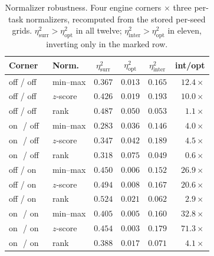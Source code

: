 \documentclass[letterpaper]{article}
\theoremstyle{plain}
\begin{document}
\begin{table}[t]
\centering
\caption{Normalizer robustness. Four engine corners $\times$ three per-task normalizers, recomputed from the stored per-seed grids. $\eta^2_{\text{surr}}>\eta^2_{\text{opt}}$ in all twelve; $\eta^2_{\text{inter}}>\eta^2_{\text{opt}}$ in eleven, inverting only in the marked row.}
\label{tab:normrob}
\small
\setlength{\tabcolsep}{3.5pt}
\begin{tabular}{llcccr}
\toprule
Corner & Norm. & $\eta^2_{\text{surr}}$ & $\eta^2_{\text{opt}}$ & $\eta^2_{\text{inter}}$ & int/opt \\
\midrule
off / off & min--max & $0.367$ & $0.013$ & $0.165$ & $12.4\times$ \\
off / off & $z$-score & $0.426$ & $0.019$ & $0.193$ & $10.0\times$ \\
off / off & rank      & $0.487$ & $0.050$ & $0.053$ & $1.1\times$ \\
on\ \,/ off & min--max & $0.283$ & $0.036$ & $0.146$ & $4.0\times$ \\
on\ \,/ off & $z$-score & $0.347$ & $0.042$ & $0.189$ & $4.5\times$ \\
on\ \,/ off & rank     & $0.318$ & $0.075$ & $0.049$ & $\mathbf{0.6\times}$ \\
off / on\ \, & min--max & $0.450$ & $0.006$ & $0.152$ & $26.9\times$ \\
off / on\ \, & $z$-score & $0.494$ & $0.008$ & $0.167$ & $20.6\times$ \\
off / on\ \, & rank     & $0.524$ & $0.021$ & $0.062$ & $2.9\times$ \\
on\ \,/ on\ \, & min--max & $0.405$ & $0.005$ & $0.160$ & $32.8\times$ \\
on\ \,/ on\ \, & $z$-score & $0.454$ & $0.003$ & $0.179$ & $71.3\times$ \\
on\ \,/ on\ \, & rank     & $0.388$ & $0.017$ & $0.071$ & $4.1\times$ \\
\bottomrule
\end{tabular}
\end{table}
\end{document}
